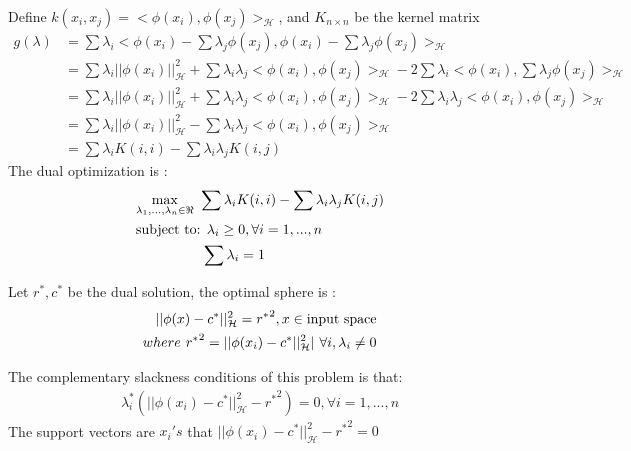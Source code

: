 \documentclass{article}
\newenvironment{sub}[2][$-$]{\begin{trivlist}
		\item[\hskip \labelsep {\bfseries #1}\hskip \labelsep {\bfseries #2.}]}  {\end{trivlist}}
\begin{document}
\begin{sub}{9.4}
\end{sub}
Define $k(x_i,x_j) = <\phi(x_i),\phi(x_j)>_\mathcal{H}$, and $K_{n\times n}$ be the kernel matrix
\begin{align}
g(\lambda) &=  \sum  \lambda_i<\phi(x_i) - \sum \lambda_j\phi(x_j),\phi(x_i) - \sum \lambda_j\phi(x_j)>_\mathcal{H}\\
&= \sum \lambda_i ||\phi(x_i)||^2_\mathcal{H} + \sum \lambda_i\lambda_j <\phi(x_i),\phi(x_j)>_\mathcal{H} - 2\sum \lambda_i <\phi(x_i),\sum \lambda_j \phi(x_j)>_\mathcal{H}\\
&= \sum \lambda_i ||\phi(x_i)||^2_\mathcal{H} + \sum \lambda_i\lambda_j <\phi(x_i),\phi(x_j)>_\mathcal{H} - 2\sum \lambda_i\lambda_j <\phi(x_i),\phi(x_j)>_\mathcal{H}\\
&= \sum \lambda_i ||\phi(x_i)||^2_\mathcal{H} - \sum \lambda_i\lambda_j <\phi(x_i),\phi(x_j)>_\mathcal{H} \\
&= \sum \lambda_i K(i,i) - \sum \lambda_i\lambda_j K(i,j) 
\end{align}
The dual optimization is :
\begin{align}
 &  \underset{\lambda_1,...,\lambda_n \in \Re}{\operatorname{max}} \hspace{0.05in} 
  \sum \lambda_i K(i,i) - \sum \lambda_i\lambda_j K(i,j) \\
 & \text{subject to: } \lambda_i \geq 0 , \forall i = 1,..., n\\
 &\hspace{0.65in}  \sum \lambda_i = 1
\end{align}

\begin{sub}{9.5}
\end{sub}

Let $r^*, c^*$ be the dual solution, the optimal sphere is :
\begin{align}
||\phi(x) - c^*||^2_\mathcal{H} = {r^*}^2, x \in \text{input space}\\
where\hspace{0.05in} {r^*}^2 = ||\phi(x_i) - c^*||^2_\mathcal{H} | \hspace{0.05in }\forall i, \lambda_i \neq 0
\end{align}

\begin{sub}{9.6}
\end{sub}

The complementary slackness conditions of this problem is that:
\begin{align}
 \lambda_i^*(||\phi(x_i) - c^*||_{\mathcal{H}}^2 - {r^*}^2) = 0, \forall i = 1,...,n
\end{align}
The support vectors are $x_i's$ that $||\phi(x_i) - c^*||_{\mathcal{H}}^2 - {r^*}^2 = 0$
\end{document}
